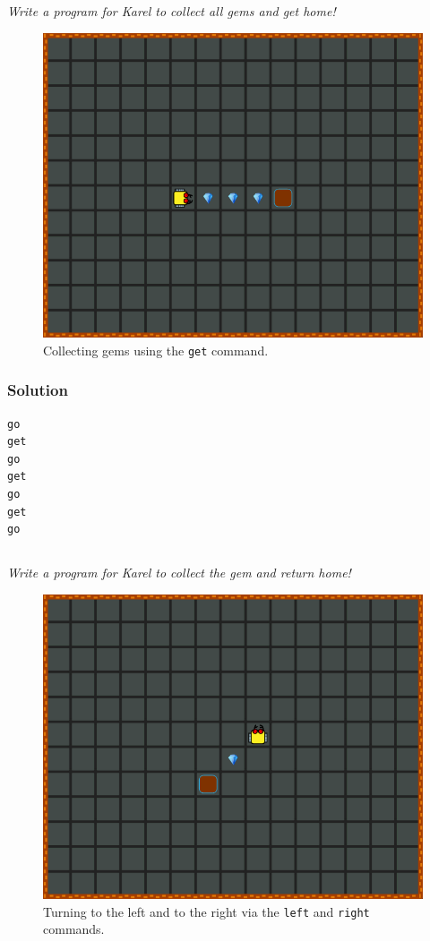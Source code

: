 \documentclass[article,A4,12pt]{llncs}
\begin{document}
{\em Write a program for Karel to collect all gems and get home! 

\begin{figure}[!ht]
\begin{center}
\includegraphics[height=0.4\textwidth]{imgk/b02.png}
\end{center}
\vspace{-4mm}
\caption{Collecting gems using the {\tt get} command.}
\label{fig:b02}
\vspace{-4mm}
\end{figure}
\noindent

\subsubsection{Solution}
\begin{verbatim}
go
get
go
get
go
get 
go
\end{verbatim}

\newpage
\subsection{}

{\em Write a program for Karel to collect the gem and return home! 

\begin{figure}[!ht]
\begin{center}
\includegraphics[height=0.4\textwidth]{imgk/b03.png}
\end{center}
\vspace{-4mm}
\caption{Turning to the left and to the right via the {\tt left} and {\tt right} commands.}
\label{fig:b03}
\vspace{-4mm}
\end{figure}
\noindent

}}
\end{document}
